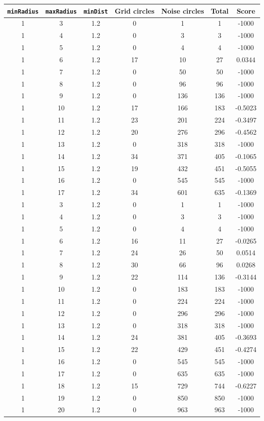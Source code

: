 \documentclass[letterpaper, 12pt]{article}
\begin{document}
\begin{longtable}{|c|c|c|c|c|c|c|}
\hline
\textbf{\texttt{minRadius}} & \textbf{\texttt{maxRadius}} & \textbf{\texttt{minDist}} & \textbf{Grid circles} & \textbf{Noise circles} & \textbf{Total} & \textbf{Score} \\
\hline
1 & 3 & 1.2 & 0 & 1 & 1 & -1000 \\
\hline
1 & 4 & 1.2 & 0 & 3 & 3 & -1000 \\
\hline
1 & 5 & 1.2 & 0 & 4 & 4 & -1000 \\
\hline
1 & 6 & 1.2 & 17 & 10 & 27 & 0.0344 \\
\hline
1 & 7 & 1.2 & 0 & 50 & 50 & -1000 \\
\hline
1 & 8 & 1.2 & 0 & 96 & 96 & -1000 \\
\hline
1 & 9 & 1.2 & 0 & 136 & 136 & -1000 \\
\hline
1 & 10 & 1.2 & 17 & 166 & 183 & -0.5023 \\
\hline
1 & 11 & 1.2 & 23 & 201 & 224 & -0.3497 \\
\hline
1 & 12 & 1.2 & 20 & 276 & 296 & -0.4562 \\
\hline
1 & 13 & 1.2 & 0 & 318 & 318 & -1000 \\
\hline
1 & 14 & 1.2 & 34 & 371 & 405 & -0.1065 \\
\hline
1 & 15 & 1.2 & 19 & 432 & 451 & -0.5055 \\
\hline
1 & 16 & 1.2 & 0 & 545 & 545 & -1000 \\
\hline
1 & 17 & 1.2 & 34 & 601 & 635 & -0.1369 \\
\hline
1 & 3 & 1.2 & 0 & 1 & 1 & -1000 \\
\hline
1 & 4 & 1.2 & 0 & 3 & 3 & -1000 \\
\hline
1 & 5 & 1.2 & 0 & 4 & 4 & -1000 \\
\hline
1 & 6 & 1.2 & 16 & 11 & 27 & -0.0265 \\
\hline
1 & 7 & 1.2 & 24 & 26 & 50 & 0.0514 \\
\hline
1 & 8 & 1.2 & 30 & 66 & 96 & 0.0268 \\
\hline
1 & 9 & 1.2 & 22 & 114 & 136 & -0.3144 \\
\hline
1 & 10 & 1.2 & 0 & 183 & 183 & -1000 \\
\hline
1 & 11 & 1.2 & 0 & 224 & 224 & -1000 \\
\hline
1 & 12 & 1.2 & 0 & 296 & 296 & -1000 \\
\hline
1 & 13 & 1.2 & 0 & 318 & 318 & -1000 \\
\hline
1 & 14 & 1.2 & 24 & 381 & 405 & -0.3693 \\
\hline
1 & 15 & 1.2 & 22 & 429 & 451 & -0.4274 \\
\hline
1 & 16 & 1.2 & 0 & 545 & 545 & -1000 \\
\hline
1 & 17 & 1.2 & 0 & 635 & 635 & -1000 \\
\hline
1 & 18 & 1.2 & 15 & 729 & 744 & -0.6227 \\
\hline
1 & 19 & 1.2 & 0 & 850 & 850 & -1000 \\
\hline
1 & 20 & 1.2 & 0 & 963 & 963 & -1000 \\
\hline
\end{longtable}
\end{document}
